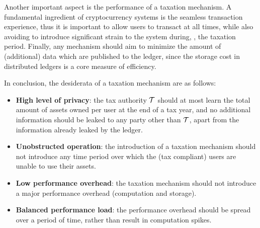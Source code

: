 Another important aspect is the performance of a taxation mechanism.  A
fundamental ingredient of cryptocurrency systems is the seamless transaction
experience, thus it is important to allow users to transact at all times, while
also avoiding to introduce significant strain to the system during, \eg, the
taxation period. Finally, any mechanism should aim to minimize the amount of
(additional) data which are published to the ledger, since the storage cost in
distributed ledgers is a core measure of efficiency.

In conclusion, the desiderata of a taxation mechanism are as follows:
\begin{itemize}
    \item \textbf{High level of privacy}: the tax authority $\mathcal{T}$ should
        at most learn the total amount of assets owned per user at the end of a
        tax year, and no additional information should be leaked to any party
        other than $\mathcal{T}$, apart from the information already leaked by
        the ledger.
    \item \textbf{Unobstructed operation}: the introduction of a taxation
        mechanism should not introduce any time period over which the (tax
        compliant) users are unable to use their assets.
    \item \textbf{Low performance overhead}: the taxation mechanism should not
        introduce a major performance overhead (\ie computation and storage).
    \item \textbf{Balanced performance load}: the performance overhead should
        be spread over a period of time, rather than result in computation
        spikes.
\end{itemize}
